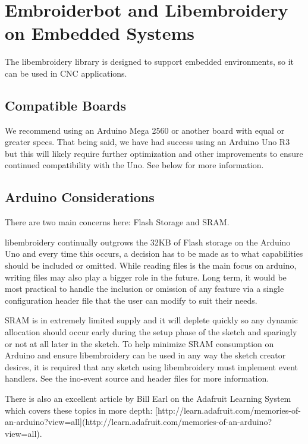 \chapter{Embroiderbot and Libembroidery on Embedded Systems}

The libembroidery library is designed to support embedded environments, so it can be used in CNC applications.

\section{Compatible Boards}

We recommend using an Arduino Mega 2560 or another board with equal or
greater specs. That being said, we have had success using an Arduino Uno
R3 but this will likely require further optimization and other
improvements to ensure continued compatibility with the Uno. See below
for more information.

\section{Arduino Considerations}

There are two main concerns here: Flash Storage and SRAM.

libembroidery continually outgrows the 32KB of Flash storage on the Arduino Uno and every time this occurs, a decision has to be made as to what capabilities should be included or omitted. While reading files is the main focus on arduino, writing files may also play a bigger role in the future. Long term, it would be most practical to handle the inclusion or omission of any feature via a single configuration header file that the user can modify to suit their needs.

SRAM is in extremely limited supply and it will deplete quickly so any dynamic allocation should occur early during the setup phase of the sketch and sparingly or not at all later in the sketch. To help minimize SRAM consumption on Arduino and ensure libembroidery can be used in any way the sketch creator desires, it is required that any sketch using libembroidery must implement event handlers. See the ino-event source and header files for more information.

There is also an excellent article by Bill Earl on the Adafruit Learning
System which covers these topics in more depth:
[http://learn.adafruit.com/memories-of-an-arduino?view=all](http://learn.adafruit.com/memories-of-an-arduino?view=all).

